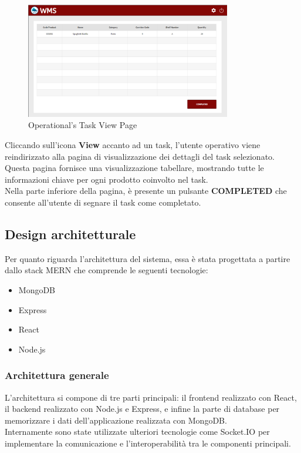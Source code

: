 \begin{figure}[H]
    \centering
    \includegraphics[width=0.8\textwidth]{document/sections/img/taskPageOp.png}
    \caption{Operational's Task View Page}
    \label{fig:taskPageOp}
\end{figure}
Cliccando sull'icona \textbf{View} accanto ad un task, l'utente operativo viene reindirizzato alla pagina di
visualizzazione dei dettagli del task selezionato.\\
Questa pagina fornisce una visualizzazione tabellare, mostrando tutte le informazioni chiave per ogni prodotto
coinvolto nel task.\\
Nella parte inferiore della pagina, è presente un pulsante \textbf{COMPLETED} che consente all'utente di
segnare il task come completato.


\subsection{Design architetturale}
Per quanto riguarda l'architettura del sistema, essa è stata progettata a partire dallo stack MERN che
comprende le seguenti tecnologie:
\begin{itemize}
    \item MongoDB
    \item Express
    \item React
    \item Node.js
\end{itemize}
\subsubsection{Architettura generale}

L'architettura si compone di tre parti principali: il frontend realizzato con React\cite{react}, il backend
realizzato con Node.js e Express, e infine la parte di database per memorizzare i dati dell'applicazione
realizzata con MongoDB.\\ Internamente sono state utilizzate ulteriori tecnologie come Socket.IO
per implementare la comunicazione e l'interoperabilità tra le componenti principali.

